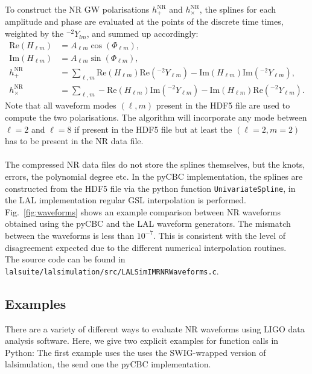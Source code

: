 \documentclass[11pt,tightenlines,article,amssymb,amsmath,amsfonts,superscriptaddress]{revtex4}
\begin{document}
To construct the NR GW polarisations $h^\mathrm{NR}_+$ and $h^\mathrm{NR}_\times$, the splines for each amplitude and phase are evaluated at the points of the discrete time times, weighted by the ${}^{-2}Y_{lm}$, and summed up accordingly:
\begin{align}
\label{}
    \mathrm{Re}(H_{\ell m}) &= A_{\ell m} \cos(\Phi_{\ell m}),   \\
    \mathrm{Im}(H_{\ell m}) &= A_{\ell m} \sin(\Phi_{\ell m}),   \\
    h^\mathrm{NR}_+ &= \sum_{\ell, m} \mathrm{Re}(H_{\ell m}) \mathrm{Re}({}^{-2}Y_{\ell m}) - \mathrm{Im}(H_{\ell m}) \mathrm{Im}({}^{-2}Y_{\ell m}), \\
    h^\mathrm{NR}_\times &= \sum_{\ell, m} -\mathrm{Re}(H_{\ell m}) \mathrm{Im}({}^{-2}Y_{\ell m}) - \mathrm{Im}(H_{\ell m}) \mathrm{Re}({}^{-2}Y_{\ell m}).
\end{align}
Note that all waveform modes $(\ell, m)$ present in the HDF5 file are used
to compute the two polarisations. The algorithm will incorporate any mode between $\ell =2$ and $\ell =8$ if present in the
HDF5 file but at least the $(\ell=2, m=2)$ has to be present in the NR data file. \\
\\
The compressed NR data files do not store the splines themselves, but the knots, errors, the polynomial degree etc. In the pyCBC implementation,
the splines are constructed from the HDF5 file via the python function \texttt{UnivariateSpline}, in the LAL implementation regular GSL interpolation
is performed. Fig.~\ref{fig:waveforms} shows an example comparison between NR waveforms obtained using the pyCBC and the LAL waveform generators. The mismatch
between the waveforms is less than $10^{-7}$. This is consistent with the level of disagreement expected due to the different numerical interpolation
routines. \\
The source code can be found in \texttt{lalsuite/lalsimulation/src/LALSimIMRNRWaveforms.c}.


\subsection{Examples}
There are a variety of different ways to evaluate NR waveforms using LIGO data analysis software. Here, we give two explicit examples
for function calls in Python: The first example uses the uses the SWIG-wrapped version of lalsimulation, the send one the pyCBC implementation.
\end{document}
